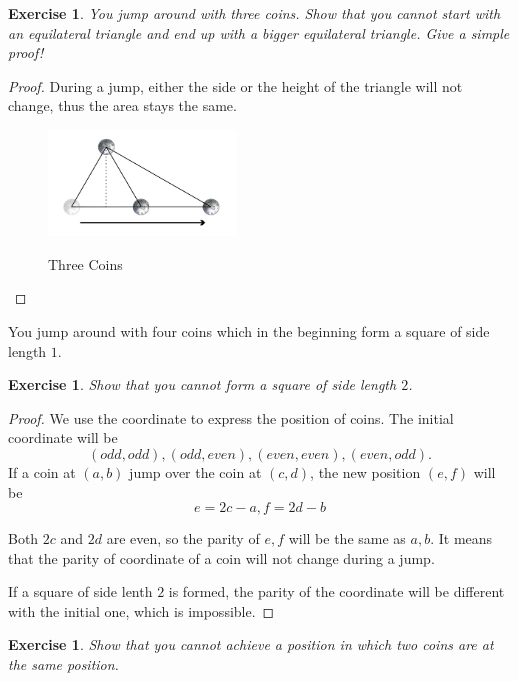 \documentclass[12pt,a4]{article}
\theoremstyle{exercise}
\newtheorem{exercise}[theorem]{Exercise}
\begin{document}
\begin{exercise}
    You jump around with three coins.
    Show that you cannot start with an equilateral triangle and end up with a bigger equilateral triangle.
    Give a simple proof!
\end{exercise}

\begin{proof}
    During a jump, either the side or the height of the triangle will not change, thus the area stays the same.

    \begin{figure}[H]
        \small
        \centering
        \includegraphics[width=5cm]{threecoins.png}
        \label{fig:threeCoins}
        \caption{Three Coins}
    \end{figure}

\end{proof}

You jump around with four coins which in the beginning form a square of side length $1$.

\begin{exercise}
    Show that you cannot form a square of side length $2$.
\end{exercise}

\begin{proof}
     We use the coordinate to express the position of coins. The initial coordinate will be
    $$
    (odd, odd), (odd, even), (even, even), (even, odd).
    $$
    If a coin at $(a, b)$ jump over the coin at $(c, d)$, the new position $(e, f)$ will be
    $$
    e = 2c - a, f = 2d - b
    $$

  Both $2c$ and $2d$ are even, so the parity of $e, f$ will be the same as $a, b$. It means that the parity of coordinate of a coin will not change during a jump.

  If a square of side lenth $2$ is formed, the parity of the coordinate will be diﬀerent with the initial one, which is impossible.
\end{proof}

\begin{exercise}
    Show that you cannot achieve a position in which two coins are at the same position.
\end{exercise}
\end{document}
